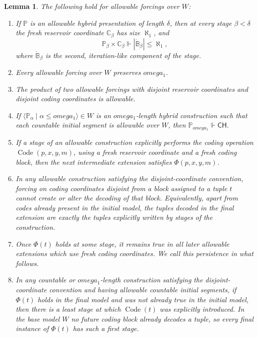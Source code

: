 \documentclass[10pt,a4paper]{amsart}
\newtheorem{lemma}{Lemma}
\newcommand{\CH}{\mathsf{CH}}
\newcommand{\Code}{\operatorname{Code}}
\newcommand{\forceP}{\mathbb{P}}
\def\omega{omega}%
\begin{document}
\begin{lemma}\label{lem:basic-preservation}
The following hold for allowable forcings over $W$:
\begin{enumerate}[label=\textup{(\roman*)}]
\item If $\forceP$ is an allowable hybrid presentation of length $\delta$, then at every stage $\beta<\delta$ the fresh reservoir coordinate $\mathbb C_\beta$ has size $\aleph_1$, and
\[
   \forceP_\beta\times\mathbb C_\beta
   \Vdash
   |\dot{\mathbb B}_\beta|\leq\aleph_1,
\]
where $\dot{\mathbb B}_\beta$ is the second, iteration-like component of the stage.
\item Every allowable forcing over $W$ preserves $\omega_1$.
\item The product of two allowable forcings with disjoint reservoir coordinates and disjoint coding coordinates is allowable.
\item If $\langle\forceP_\alpha\mid\alpha\leq\omega_1\rangle\in W$ is an $\omega_1$-length hybrid construction such that each countable initial segment is allowable over $W$, then $\forceP_{\omega_1} \Vdash \CH$.
\item  If a stage of an allowable construction explicitly performs the coding operation $\Code(p,x,y,m)$, using a fresh reservoir coordinate and a fresh coding block, then the next intermediate extension satisfies $\Phi(p,x,y,m)$.
\item  In any allowable construction satisfying the disjoint-coordinate convention, forcing on coding coordinates disjoint from a block assigned to a tuple $t$ cannot create or alter the decoding of that block. Equivalently, apart from codes already present in the initial model, the tuples decoded in the final extension are exactly the tuples explicitly written by stages of the construction.
\item  Once $\Phi(t)$ holds at some stage, it remains true in all later allowable extensions which use fresh coding coordinates. We call this persistence in what follows.
\item  In any countable or $\omega_1$-length construction satisfying the disjoint-coordinate convention and having allowable countable initial segments, if $\Phi(t)$ holds in the final model and was not already true in the initial model, then there is a least stage at which $\Code(t)$ was explicitly introduced. In the base model $W$ no future coding block already decodes a tuple, so every final instance of $\Phi(t)$ has such a first stage.
\end{enumerate}
\end{lemma}
\end{document}

